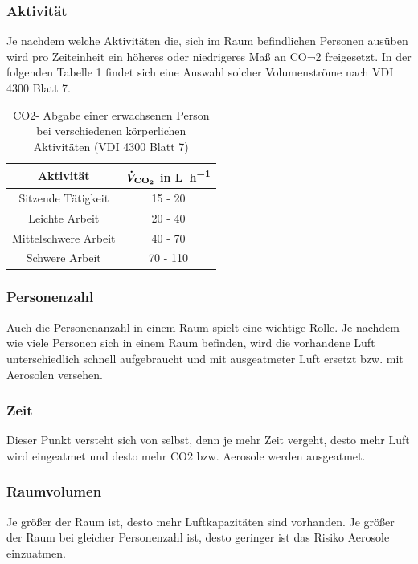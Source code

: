 \subsubsection*{Aktivität}
Je nachdem welche Aktivitäten die, sich im Raum befindlichen Personen ausüben wird pro Zeiteinheit ein höheres oder niedrigeres Maß an CO¬2 freigesetzt. In der folgenden Tabelle 1 findet sich eine Auswahl solcher Volumenströme nach VDI 4300 Blatt 7.

\begin{table}[h!]
	\renewcommand*{\arraystretch}{1.2}
	\centering
	\caption{CO2- Abgabe einer erwachsenen Person bei verschiedenen körperlichen Aktivitäten (VDI 4300 Blatt 7)}
	\label{tab:aktivitaeten}
		\begin{tabulary}{1.0\textwidth}{C|C}
			\hline
			\textbf{Aktivität} 	& \textbf{$\boldmath \dot{V}_{\ce{CO2}}$ in \si{\liter \per \hour}}\\
			\hline
			Sitzende Tätigkeit 	& 15 - 20 \\
			Leichte Arbeit			& 20 - 40 \\
			Mittelschwere Arbeit & 40 - 70 \\
			Schwere Arbeit 	& 70 - 110\\
			\hline			
		\end{tabulary}
\end{table}
\FloatBarrier

\subsubsection*{Personenzahl}
Auch die Personenanzahl in einem Raum spielt eine wichtige Rolle. Je nachdem wie viele Personen sich in einem Raum befinden, wird die vorhandene Luft unterschiedlich schnell aufgebraucht und mit ausgeatmeter Luft ersetzt bzw. mit Aerosolen versehen.

\subsubsection*{Zeit}
Dieser Punkt versteht sich von selbst, denn je mehr Zeit vergeht, desto mehr Luft wird eingeatmet und desto mehr CO2 bzw. Aerosole werden ausgeatmet.

\subsubsection*{Raumvolumen}
Je größer der Raum ist, desto mehr Luftkapazitäten sind vorhanden. Je größer der Raum bei gleicher Personenzahl ist, desto geringer ist das Risiko Aerosole einzuatmen.


